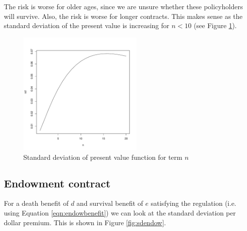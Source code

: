 \documentclass[12pt]{article}
\begin{document}
The risk is worse for older ages, since we are unsure whether these policyholders will survive. Also, the risk is worse for longer contracts. This makes sense as the standard deviation of the present value is increasing for $n < 10$ (see Figure \ref{fig:pvvar}).

\begin{figure}[ht]
\vspace{-10mm}
\begin{center}
\includegraphics[width=0.55\textwidth]{images/varpv}
\vspace{-5mm}
\end{center}
\caption{Standard deviation of present value function for term $n$}
\label{fig:pvvar}
\end{figure}

\subsection{Endowment contract}

For a death benefit of $d$ and survival benefit of $e$ satisfying the regulation (i.e. using Equation \ref{eqn:endowbenefit}) we can look at the standard deviation per dollar premium. This is shown in Figure \ref{fig:sdendow}.
\end{document}

